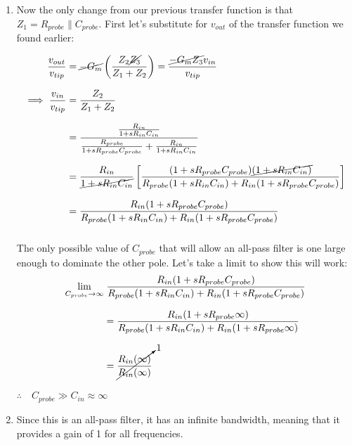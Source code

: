 \documentclass[12pt, fleqn]{article}
\begin{document}
\begin{enumerate}[label=(\roman*)]
{    The first pole at the lower frequency limits the bandwidth of this filter.
    }
    \newpage
    \item
    {
    Now the only change from our previous transfer function is that $Z_1 = R_{probe} \parallel C_{probe}$.  First let's substitute for $v_{out}$ of the transfer function we found earlier:
    
    \begin{align*}
        \frac{v_{out}}{v_{tip}} &= \cancel{-G_m}\left(\frac{Z_2 \cancel{Z_3}}{Z_1 + Z_2}\right) = \frac{\cancel{-G_m Z_3} v_{in}}{v_{tip}}\\[0.25cm]
        \implies \frac{v_{in}}{v_{tip}} &= \frac{Z_2}{Z_1 + Z_2}\\[0.25cm]
        &= \frac{\frac{R_{in}}{1 + s R_{in} C_{in}}}{\frac{R_{probe}}{1 + s R_{probe} C_{probe}} + \frac{R_{in}}{1 + s R_{in} C_{in}}}\\[0.25cm]
        &= \frac{R_{in}}{\cancel{1 + s R_{in} C_{in}}}\left[\frac{(1 + s R_{probe} C_{probe})\cancel{(1 + s R_{in} C_{in})}}{R_{probe}(1 + s R_{in} C_{in}) + R_{in}(1 + s R_{probe} C_{probe})}\right]\\[0.25cm]
        &= \frac{R_{in}(1 + s R_{probe} C_{probe})}{R_{probe}(1 + s R_{in} C_{in}) + R_{in}(1 + s R_{probe} C_{probe})}\\[0.25cm]
    \end{align*}
    
    The only possible value of $C_{probe}$ that will allow an all-pass filter is one large enough to dominate the other pole.  Let's take a limit to show this will work:
    \begin{align*}
        \lim_{C_{probe}\to\infty} &\; \frac{R_{in}(1 + s R_{probe} C_{probe})}{R_{probe}(1 + s R_{in} C_{in}) + R_{in}(1 + s R_{probe} C_{probe})}\\[0.25cm]
        &= \frac{R_{in}(1 + s R_{probe} \infty)}{R_{probe}(1 + s R_{in} C_{in}) + R_{in}(1 + s R_{probe} \infty)}\\[0.25cm]
        &= \cancelto{1}{\frac{R_{in}(\infty)}{R_{in}(\infty)}}
    \end{align*}
    
    $\therefore \quad \boxed{C_{probe} \gg C_{in} \approx \infty}$
    }
    \vspace{1cm}
    \item
    {
    Since this is an all-pass filter, it has an infinite bandwidth, meaning that it provides a gain of 1 for all frequencies.
    }
\end{enumerate}
\newpage
\end{document}
